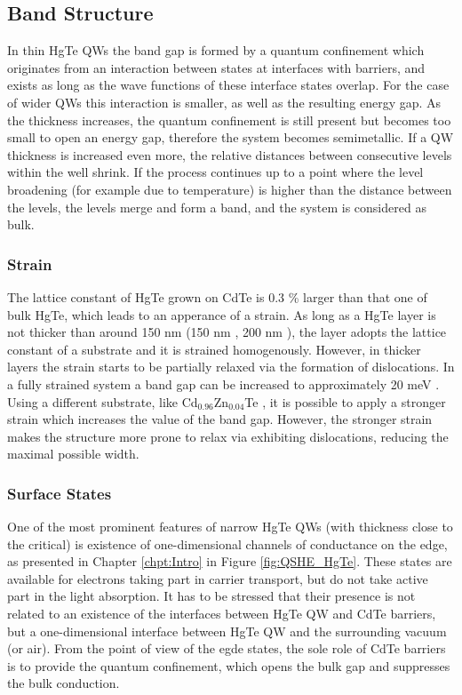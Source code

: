 \documentclass[titlepage,a4paper]{book}
\newcommand{\wciecie}{\quad\phantom{v}}
\begin{document}
\subsection{Band Structure}
\wciecie
In thin HgTe QWs the band gap is formed by a quantum confinement which originates from an interaction between states at interfaces with barriers, and exists as long as the wave functions of these interface states overlap. For the case of wider QWs this interaction is smaller, as well as the resulting energy gap. As the thickness increases, the quantum confinement is still present but becomes too small to open an energy gap, therefore the system becomes semimetallic. If a QW thickness is increased even more, the relative distances between consecutive levels within the well shrink. If the process continues up to a point where the level broadening (for example due to temperature) is higher than the distance between the levels, the levels merge and form a band, and the system is considered as bulk.

\subsubsection{Strain}
\wciecie
The lattice constant of HgTe grown on CdTe is 0.3 \% larger than that one of bulk HgTe, which leads to an apperance of a strain. As long as a HgTe layer is not thicker than around 150 nm (150 nm \cite{Crauste_StrainedMCT}, 200 nm \cite{Brune_State2}), the layer adopts the lattice constant of a substrate and it is strained homogenously. However, in thicker layers the strain starts to be partially relaxed via the formation of dislocations. In a fully strained system a band gap can be increased to approximately 20 meV \cite{Brune_State2}\cite{Crauste_StrainedMCT}. Using a different substrate, like Cd$_{0.96}$Zn$_{0.04}$Te \cite{Leubner_State}, it is possible to apply a stronger strain which increases the value of the band gap. However, the stronger strain makes the structure more prone to relax via exhibiting dislocations, reducing the maximal possible width.

\subsubsection{Surface States}
\wciecie
One of the most prominent features of narrow HgTe QWs (with thickness close to the critical) is existence of one-dimensional channels of conductance on the edge, as presented in Chapter \ref{chpt:Intro} in Figure \ref{fig:QSHE_HgTe}. These states are available for electrons taking part in carrier transport, but do not take active part in the light absorption. It has to be stressed that their presence is not related to an existence of the interfaces between HgTe QW and CdTe barriers, but a one-dimensional interface between HgTe QW and the surrounding vacuum (or air). From the point of view of the egde states, the sole role of CdTe barriers is to provide the quantum confinement, which opens the bulk gap and suppresses the bulk conduction. 
\end{document}
